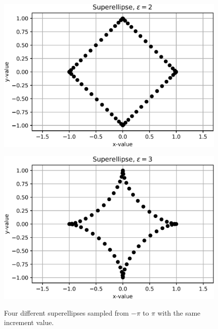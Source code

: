 \begin{figure}[h!]
\begin{minipage}[h]{0.3\textwidth}
		\label{fig:Se_Circle}
	\end{minipage}
	\begin{minipage}[h]{0.3\textwidth}
		\includegraphics[width=1\textwidth]{import/Se_Rhomb}
		\label{fig:Se_Rhomb}
	\end{minipage}
	\begin{minipage}[h]{0.3\textwidth}
		\includegraphics[width=1\textwidth]{import/Se_Concave}
		\label{fig:Se_Concave}
	\end{minipage}
	\caption{Four different superellipses sampled from $-\pi$ to $\pi$ with the same increment value.}
	\label{fig:Superellipses}
\end{figure}

